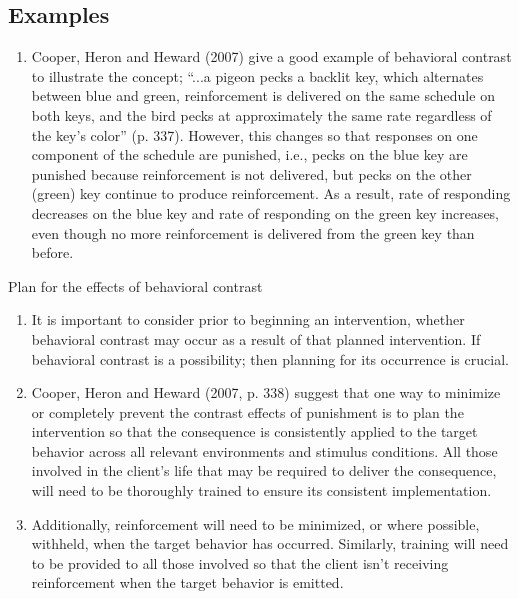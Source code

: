 \subsection{Examples}
\begin{enumerate}
\item Cooper, Heron and Heward (2007) give a good example of behavioral contrast to illustrate the concept; ``...a pigeon pecks a backlit key, which alternates between blue and green, reinforcement is delivered on the same schedule on both keys, and the bird pecks at approximately the same rate regardless of the key's color'' (p. 337). However, this changes so that responses on one component of the schedule are punished, i.e., pecks on the blue key are punished because reinforcement is not delivered, but pecks on the other (green) key continue to produce reinforcement. As a result, rate of responding decreases on the blue key and rate of responding on the green key increases, even though no more reinforcement is delivered from the green key than before.
\end{enumerate}
%
Plan for the effects of behavioral contrast
\begin{enumerate}
\item It is important to consider prior to beginning an intervention, whether behavioral contrast may occur as a result of that planned intervention. If behavioral contrast is a possibility; then planning for its occurrence is crucial.
\item Cooper, Heron and Heward (2007, p. 338) suggest that one way to minimize or completely prevent the contrast effects of punishment is to plan the intervention so that the consequence is consistently applied to the target behavior across all relevant environments and stimulus conditions. All those involved in the client's life that may be required to deliver the consequence, will need to be thoroughly trained to ensure its consistent implementation.
\item Additionally, reinforcement will need to be minimized, or where possible, withheld, when the target behavior has occurred. Similarly, training will need to be provided to all those involved so that the client isn't receiving reinforcement when the target behavior is emitted.
\end{enumerate}
%
